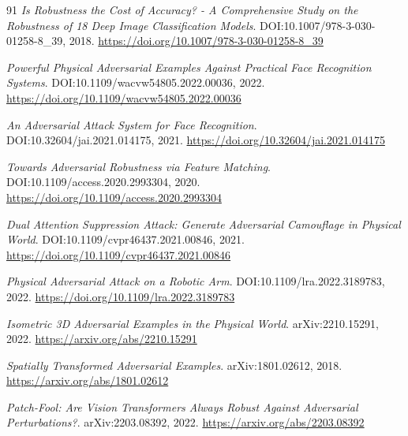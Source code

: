 \documentclass[11pt,a4paper]{article}
\begin{document}
\begin{thebibliography}{91}
\newblock \emph{Is Robustness the Cost of Accuracy? - A Comprehensive Study on the Robustness of 18 Deep Image Classification Models}.
\newblock DOI:10.1007/978-3-030-01258-8\_39, 2018.
\newblock \url{https://doi.org/10.1007/978-3-030-01258-8_39}

\newblock \emph{Powerful Physical Adversarial Examples Against Practical Face Recognition Systems}.
\newblock DOI:10.1109/wacvw54805.2022.00036, 2022.
\newblock \url{https://doi.org/10.1109/wacvw54805.2022.00036}

\newblock \emph{An Adversarial Attack System for Face Recognition}.
\newblock DOI:10.32604/jai.2021.014175, 2021.
\newblock \url{https://doi.org/10.32604/jai.2021.014175}

\newblock \emph{Towards Adversarial Robustness via Feature Matching}.
\newblock DOI:10.1109/access.2020.2993304, 2020.
\newblock \url{https://doi.org/10.1109/access.2020.2993304}

\newblock \emph{Dual Attention Suppression Attack: Generate Adversarial Camouflage in Physical World}.
\newblock DOI:10.1109/cvpr46437.2021.00846, 2021.
\newblock \url{https://doi.org/10.1109/cvpr46437.2021.00846}

\newblock \emph{Physical Adversarial Attack on a Robotic Arm}.
\newblock DOI:10.1109/lra.2022.3189783, 2022.
\newblock \url{https://doi.org/10.1109/lra.2022.3189783}

\newblock \emph{Isometric 3D Adversarial Examples in the Physical World}.
\newblock arXiv:2210.15291, 2022.
\newblock \url{https://arxiv.org/abs/2210.15291}

\newblock \emph{Spatially Transformed Adversarial Examples}.
\newblock arXiv:1801.02612, 2018.
\newblock \url{https://arxiv.org/abs/1801.02612}

\newblock \emph{Patch-Fool: Are Vision Transformers Always Robust Against Adversarial Perturbations?}.
\newblock arXiv:2203.08392, 2022.
\newblock \url{https://arxiv.org/abs/2203.08392}

\end{thebibliography}
\end{document}
